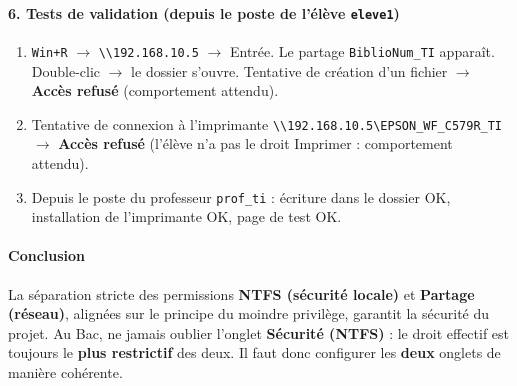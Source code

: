 \documentclass[11pt]{article}
\begin{document}
\begin{exoresolu}
\paragraph{6. Tests de validation (depuis le poste de l'élève \texttt{eleve1})}
\begin{enumerate}
    \item \texttt{Win+R} $\rightarrow$ \texttt{\textbackslash\textbackslash 192.168.10.5} $\rightarrow$ Entrée. Le partage \texttt{BiblioNum\_TI} apparaît. Double-clic $\rightarrow$ le dossier s'ouvre. Tentative de création d'un fichier $\rightarrow$ \textbf{Accès refusé} (comportement attendu).
    \item Tentative de connexion à l'imprimante \texttt{\textbackslash\textbackslash 192.168.10.5\textbackslash EPSON\_WF\_C579R\_TI} $\rightarrow$ \textbf{Accès refusé} (l'élève n'a pas le droit Imprimer : comportement attendu).
    \item Depuis le poste du professeur \texttt{prof\_ti} : écriture dans le dossier OK, installation de l'imprimante OK, page de test OK.
\end{enumerate}

\paragraph{Conclusion}
La séparation stricte des permissions \textbf{NTFS (sécurité locale)} et \textbf{Partage (réseau)}, alignées sur le principe du moindre privilège, garantit la sécurité du projet. Au Bac, ne jamais oublier l'onglet \textbf{Sécurité (NTFS)} : le droit effectif est toujours le \textbf{plus restrictif} des deux. Il faut donc configurer les \textbf{deux} onglets de manière cohérente.
\end{exoresolu}
\end{document}

